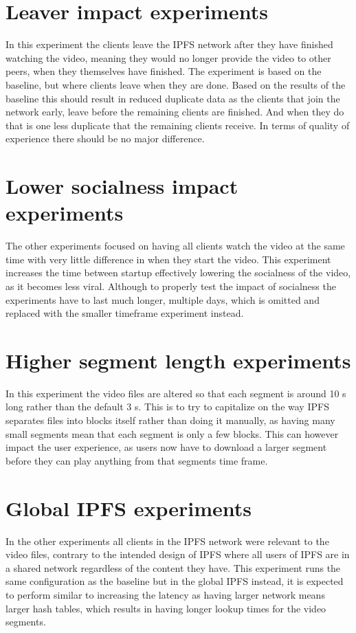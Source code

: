\section{Leaver impact experiments} %
In this experiment the clients  leave the \ac{IPFS} network after they have finished watching the video, meaning they would no longer provide the video to other peers, when they themselves have finished. The experiment is based on the baseline, but where clients leave when they are done. Based on the results of the baseline this should result in reduced duplicate data as the clients that join the network early, leave before the remaining clients are finished. And when they do that is one less duplicate that the remaining clients receive. In terms of quality of experience there should be no major difference.

\section{Lower socialness impact experiments} %
The other experiments focused on having all clients watch the video at the same time with very little difference in when they start the video. This experiment increases the time between startup effectively lowering the socialness of the video, as it becomes less viral. Although to properly test the impact of socialness the experiments have to last much longer, multiple days, which is omitted and replaced with the smaller timeframe experiment instead.




\section{Higher segment length experiments}
In this experiment the video files are altered so that each segment is around 10 \acs{s} long rather than the default 3 \acs{s}. This is to try to capitalize on the way \ac{IPFS} separates files into blocks itself rather than doing it manually, as having many small segments mean that each segment is only a few blocks. This can however impact the user experience, as users now have to download a larger segment before they can play anything from that segments time frame.

\section{Global IPFS experiments}
\label{sec:eval_global}


In the other experiments all clients in the \ac{IPFS} network were relevant to the video files, contrary to the intended design of \ac{IPFS} where all users of \ac{IPFS} are in a shared network regardless of the content they have. This experiment runs the same configuration as the baseline but in the global \ac{IPFS} instead, it is expected to perform similar to increasing the latency as having larger network means larger hash tables, which results in having longer lookup times for the video segments.

